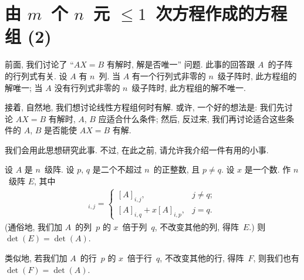 \section{\texorpdfstring{由 \(m\)~个 \(n\)~元
      \({\leq} 1\)~次方程作成的方程组 (2)}%
  {由 m 个 n 元 ≤1 次方程作成的方程组 (2)}}

\maldevigalegajxo

前面, 我们讨论了
``\(AX = B\) 有解时, 解是否唯一''
问题.
此事的回答跟 \(A\)~的子阵的行列式有关.
设 \(A\) 有 \(n\)~列.
当 \(A\) 有一个行列式非零的 \(n\)~级子阵时,
此方程组的解唯一;
当 \(A\) 没有行列式非零的 \(n\)~级子阵时,
此方程组的解不唯一.

接着, 自然地, 我们想讨论线性方程组何时有解.
或许, 一个好的想法是:
我们先讨论 \(AX = B\) 有解时,
\(A\), \(B\) 应适合什么条件;
然后, 反过来,
我们再讨论适合这些条件的 \(A\), \(B\)
是否能使 \(AX = B\) 有解.

我们会用此思想研究此事.
不过, 在此之前, 请允许我介绍一件有用的小事.

\begin{theorem}
    设 \(A\) 是 \(n\)~级阵.
    设 \(p\), \(q\) 是二个不超过 \(n\)~的正整数,
    且 \(p \neq q\).
    设 \(x\) 是一个数.
    作 \(n\)~级阵 \(E\), 其中
    \begin{align*}
        [E]_{i,j}
        = \begin{cases}
              [A]_{i,j},              & j \neq q; \\
              [A]_{i,q} + x[A]_{i,p}, & j = q.
          \end{cases}
    \end{align*}
    (通俗地,
    我们加 \(A\)~的列~\(p\) 的 \(x\)~倍于列~\(q\),
    不改变其他的列,
    得阵~\(E\).)
    则 \(\det {(E)} = \det {(A)}\).

    类似地,
    若我们加 \(A\)~的行~\(p\) 的 \(x\)~倍于行~\(q\),
    不改变其他的行,
    得阵~\(F\),
    则我们也有 \(\det {(F)} = \det {(A)}\).
\end{theorem}

